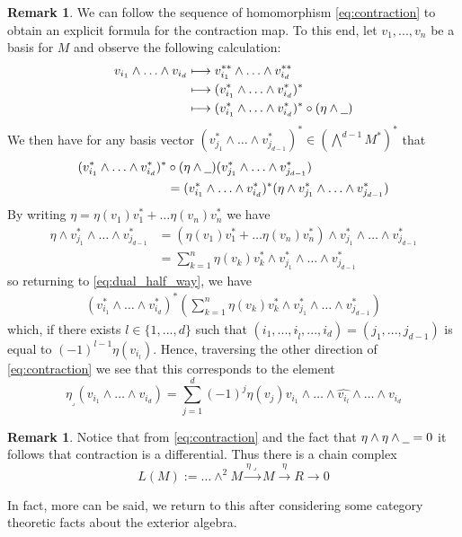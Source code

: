 \documentclass[12pt]{article}
\theoremstyle{plain}
\theoremstyle{definition}
\newtheorem{remark}[thm]{Remark}
\newcommand{\und}[1]{\underline{\hspace{#1 cm}}}
\newcommand{\lto}{\longrightarrow}
\begin{document}
\begin{remark}
We can follow the sequence of homomorphism \eqref{eq:contraction} to obtain an explicit formula for the contraction map. To this end, let $v_1,...,v_n$ be a basis for $M$ and observe the following calculation:
\begin{align*}
v_{i_1} \wedge \hdots \wedge v_{i_d} &\longmapsto v_{i_1}^{\ast\ast} \wedge \hdots \wedge v_{i_d}^{\ast\ast}\\
&\longmapsto (v_{i_1}^\ast \wedge \hdots \wedge v_{i_d}^\ast)^\ast\\
&\longmapsto (v_{i_1}^\ast \wedge \hdots \wedge v_{i_d}^\ast)^\ast\circ(\eta \wedge \und{0.2})
\end{align*}
We then have for any basis vector $(v_{j_1}^\ast \wedge \hdots \wedge v_{j_{d-1}}^\ast)^\ast \in (\bigwedge^{d-1}M^\ast)^\ast$ that
\begin{align}
(v_{i_1}^\ast \wedge \hdots \wedge v_{i_d}^\ast)^\ast&\circ(\eta \wedge \und{0.2})(v_{j_1}^\ast \wedge \hdots \wedge v_{j_{d-1}}^\ast)\\
\label{eq:dual_half_way}&= (v_{i_1}^\ast \wedge \hdots \wedge v_{i_d}^\ast)^\ast(\eta \wedge v_{j_1}^\ast \wedge \hdots \wedge v_{j_{d-1}}^\ast)
\end{align}
By writing $\eta = \eta(v_1)v_1^\ast + \hdots \eta(v_n)v_n^\ast$ we have
\begin{align*}
\eta \wedge v_{j_1}^\ast \wedge \hdots \wedge v_{j_{d-1}}^\ast &= (\eta(v_1)v_1^\ast+ \hdots \eta(v_n)v_n^\ast)\wedge v_{j_1}^\ast \wedge \hdots \wedge v_{j_{d-1}}^\ast\\
&= \sum_{k = 1}^n \eta(v_k)v_k^\ast \wedge v_{j_1}^\ast \wedge \hdots \wedge v_{j_{d-1}}^\ast
\end{align*}
so returning to \eqref{eq:dual_half_way}, we have
\begin{align*}
(v_{i_1}^\ast \wedge \hdots \wedge v_{i_d}^\ast)^\ast(\sum_{k = 1}^n \eta(v_k)v_k^\ast \wedge v_{j_1}^\ast \wedge \hdots \wedge v_{j_{d-1}}^\ast)
\end{align*}
which, if there exists $l \in \lbrace 1,...,d\rbrace$ such that $(i_1,...,i_{\hat{l}},...,i_d) = (j_1,...,j_{d-1})$ is equal to $(-1)^{l-1}\eta(v_{i_l})$. Hence, traversing the other direction of \eqref{eq:contraction} we see that this corresponds to the element
\begin{equation}
\eta_{\lrcorner}(v_{i_1} \wedge \hdots \wedge v_{i_d}) = \sum_{j = 1}^d(-1)^j \eta(v_j) v_{i_1} \wedge \hdots \wedge \hat{v_{i_l}} \wedge \hdots \wedge v_{i_d}
\end{equation}
\end{remark}
\begin{remark}\label{rmk:contraction_differential}
Notice that from \eqref{eq:contraction} and the fact that $\eta \wedge \eta \wedge \und{0.2} = 0$ it follows that contraction is a differential. Thus there is a chain complex
\begin{equation}
L(M) := \hdots \wedge^2 M \stackrel{\eta\lrcorner}{\lto} M \stackrel{\eta}{\lto} R \lto 0
\end{equation}
\end{remark}
In fact, more can be said, we return to this after considering some category theoretic facts about the exterior algebra.
\end{document}

